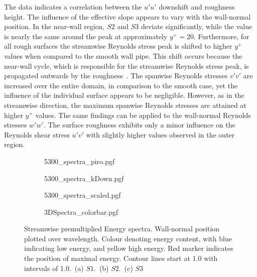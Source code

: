 The data indicates a correlation between the $u'u'$ downshift and roughness height. 
The influence of the effective slope appears to vary with the wall-normal position. 
In the near-wall region, $S2$ and $S3$ deviate significantly, while the value is nearly the same around the peak at approximately $y^+ = 20$.
Furthermore, for all rough surfaces the streamwise Reynolds stress peak is shifted to higher $y^+$ values when compared to the smooth wall pipe.
This shift occurs because the near-wall cycle, which is responsible for the streamwise Reynolds stress peak, is propagated outwards by the roughness~\citep{macdonaldTurbulentFlowTransitionally2016}.
The spanwise Reynolds stresses $v'v'$ are increased over the entire domain, in comparison to the smooth case, yet the influence of the individual surface appears to be negligible.
However, as in the streamwise direction, the maximum spanwise Reynolds stresses are attained at higher $y^+$ values.
The same findings can be applied to the wall-normal Reynolds stresses $w'w'$.
The surface roughness exhibits only a minor influence on the Reynolds shear stress $u'v'$ with slightly higher values observed in the outer region.

\begin{figure}
    \centering
    \begin{subfigure}{0.495\textwidth}
    \subcaption{}
        {5300_spectra_piro.pgf}
    \end{subfigure}
    \hfill
    \begin{subfigure}{0.495\textwidth}
        \subcaption{}
        {5300_spectra_kDown.pgf}
    \end{subfigure}
    \centering
    \begin{subfigure}{0.495\textwidth}
        \subcaption{}
        {5300_spectra_scaled.pgf}
    \end{subfigure}
    \centering
    \begin{subfigure}{\textwidth}
        \centering
        \hspace{0.7cm}
        {3DSpectra_colorbar.pgf}
    \end{subfigure}
    \caption[Streamwise energy spectra at $Re_b = 5300$]{Streamwise premultiplied Energy spectra. Wall-normal position plotted over wavelength. Colour denoting energy content, with blue indicating low energy, and yellow high energy. Red marker indicates the position of maximal energy. Contour lines start at 1.0 with intervals of 1.0.~(a) $S1$.~(b) $S2$.~(c) $S3$}
    \label{fig: Reb5300 energy spectra}
\end{figure}

